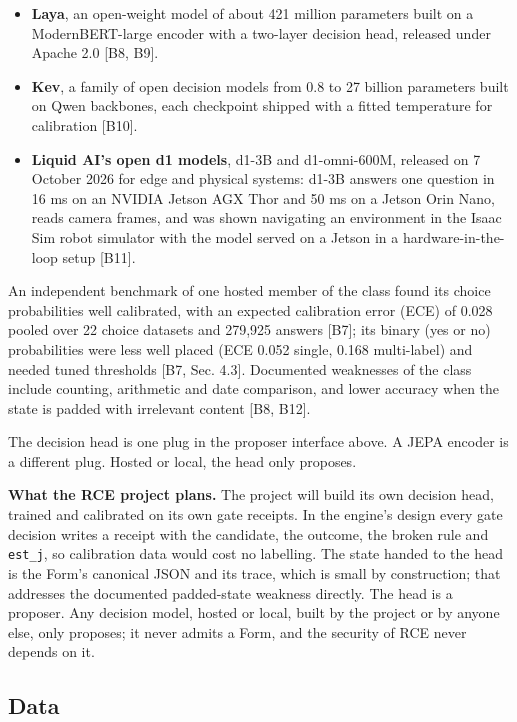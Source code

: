 \documentclass[10pt,letterpaper]{article}
\providecommand{\tightlist}{\setlength{\itemsep}{1pt}\setlength{\parskip}{0pt}}
\begin{document}
\begin{itemize}
\tightlist
\item
  \textbf{Laya}, an open-weight model of about 421 million parameters
  built on a ModernBERT-large encoder with a two-layer decision head,
  released under Apache 2.0 {[}B8, B9{]}.
\item
  \textbf{Kev}, a family of open decision models from 0.8 to 27 billion
  parameters built on Qwen backbones, each checkpoint shipped with a
  fitted temperature for calibration {[}B10{]}.
\item
  \textbf{Liquid AI's open d1 models}, d1-3B and d1-omni-600M, released
  on 7 October 2026 for edge and physical systems: d1-3B answers one
  question in 16 ms on an NVIDIA Jetson AGX Thor and 50 ms on a Jetson
  Orin Nano, reads camera frames, and was shown navigating an
  environment in the Isaac Sim robot simulator with the model served on
  a Jetson in a hardware-in-the-loop setup {[}B11{]}.
\end{itemize}

An independent benchmark of one hosted member of the class found its
choice probabilities well calibrated, with an expected calibration error
(ECE) of 0.028 pooled over 22 choice datasets and 279,925 answers
{[}B7{]}; its binary (yes or no) probabilities were less well placed
(ECE 0.052 single, 0.168 multi-label) and needed tuned thresholds {[}B7,
Sec. 4.3{]}. Documented weaknesses of the class include counting,
arithmetic and date comparison, and lower accuracy when the state is
padded with irrelevant content {[}B8, B12{]}.

The decision head is one plug in the proposer interface above. A JEPA
encoder is a different plug. Hosted or local, the head only proposes.

\textbf{What the RCE project plans.} The project will build its own
decision head, trained and calibrated on its own gate receipts. In the
engine's design every gate decision writes a receipt with the candidate,
the outcome, the broken rule and \texttt{est\_j}, so calibration data
would cost no labelling. The state handed to the head is the Form's
canonical JSON and its trace, which is small by construction; that
addresses the documented padded-state weakness directly. The head is a
proposer. Any decision model, hosted or local, built by the project or
by anyone else, only proposes; it never admits a Form, and the security
of RCE never depends on it.

\subsection{Data}\label{data}
\end{document}
